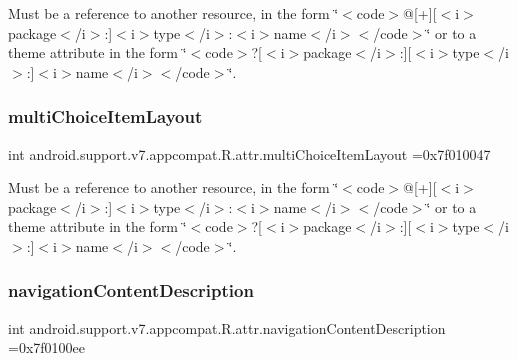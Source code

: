 Must be a reference to another resource, in the form \char`\"{}$<$code$>$@\mbox{[}+\mbox{]}\mbox{[}$<$i$>$package$<$/i$>$\+:\mbox{]}$<$i$>$type$<$/i$>$\+:$<$i$>$name$<$/i$>$$<$/code$>$\char`\"{} or to a theme attribute in the form \char`\"{}$<$code$>$?\mbox{[}$<$i$>$package$<$/i$>$\+:\mbox{]}\mbox{[}$<$i$>$type$<$/i$>$\+:\mbox{]}$<$i$>$name$<$/i$>$$<$/code$>$\char`\"{}. \mbox{\label{classandroid_1_1support_1_1v7_1_1appcompat_1_1R_1_1attr_a5478cc4fbc24577eb3dc9e7466d6e426}} 
\subsubsection{\texorpdfstring{multi\+Choice\+Item\+Layout}{multiChoiceItemLayout}}
{\footnotesize\ttfamily int android.\+support.\+v7.\+appcompat.\+R.\+attr.\+multi\+Choice\+Item\+Layout =0x7f010047\hspace{0.3cm}{\ttfamily [static]}}

Must be a reference to another resource, in the form \char`\"{}$<$code$>$@\mbox{[}+\mbox{]}\mbox{[}$<$i$>$package$<$/i$>$\+:\mbox{]}$<$i$>$type$<$/i$>$\+:$<$i$>$name$<$/i$>$$<$/code$>$\char`\"{} or to a theme attribute in the form \char`\"{}$<$code$>$?\mbox{[}$<$i$>$package$<$/i$>$\+:\mbox{]}\mbox{[}$<$i$>$type$<$/i$>$\+:\mbox{]}$<$i$>$name$<$/i$>$$<$/code$>$\char`\"{}. \mbox{\label{classandroid_1_1support_1_1v7_1_1appcompat_1_1R_1_1attr_adbceba5aef503142f0cb67ecf32c3500}} 
\subsubsection{\texorpdfstring{navigation\+Content\+Description}{navigationContentDescription}}
{\footnotesize\ttfamily int android.\+support.\+v7.\+appcompat.\+R.\+attr.\+navigation\+Content\+Description =0x7f0100ee\hspace{0.3cm}{\ttfamily [static]}}

